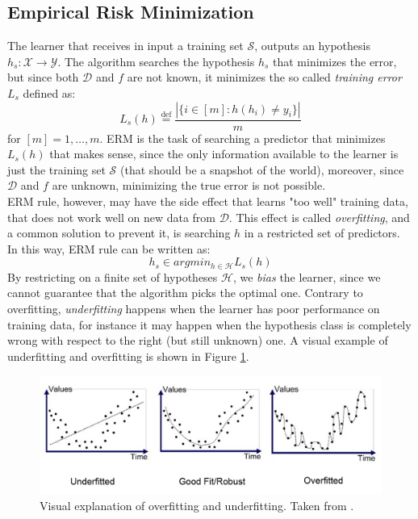 \subsection{Empirical Risk Minimization}
The learner that receives in input a training set $\mathcal{S}$, outputs an hypothesis $h_s : \mathcal{X} \rightarrow \mathcal{Y}$. The algorithm searches the hypothesis $h_s$ that minimizes the error, but since both $\mathcal{D}$ and $f$ are not known, it minimizes the so called \textit{training error} $L_s$ defined as:
\[ L_s(h) \stackrel{\text{def}}{=} \frac{|\{i \in [m] : h(h_i) \neq y_i\}|}{m} \]
for $[m] = {1, \dots, m}$. \ac{ERM} is the task of searching a predictor that minimizes $L_s(h)$ that makes sense, since the only information available to the learner is just the training set $\mathcal{S}$ (that should be a snapshot of the world), moreover, since $\mathcal{D}$ and $f$ are unknown, minimizing the true error is not possible.\\
\ac{ERM} rule, however, may have the side effect that learns "too well" training data, that does not work well on new data from $\mathcal{D}$. This effect is called \textit{overfitting}, and a common solution to prevent it, is searching $h$ in a restricted set of predictors. In this way, \ac{ERM} rule can be written as:
\[h_s \in argmin_{h \in \mathcal{H}} L_s(h)\]
By restricting on a finite set of hypotheses $\mathcal{H}$, we \textit{bias} the learner, since we cannot guarantee that the algorithm picks the optimal one. Contrary to overfitting, \textit{underfitting} happens when the learner has poor performance on training data, for instance it may happen when the hypothesis class is completely wrong with respect to the right (but still unknown) one. A visual example of underfitting and overfitting is shown in Figure \ref{fig:overfit-underfit}.

\begin{figure}
	\centering
	\includegraphics[width=1\textwidth]{figures/overfit-underfit.png}
	\caption{Visual explanation of overfitting and underfitting. Taken from \cite{underfit-overfit}.}
	\label{fig:overfit-underfit}
\end{figure}


